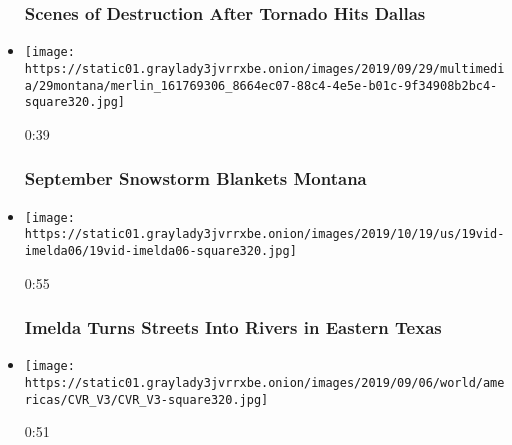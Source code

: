 \begin{itemize}
  \hypertarget{scenes-of-destruction-after-tornado-hits-dallas}{%
  \subsubsection{Scenes of Destruction After Tornado Hits
  Dallas}\label{scenes-of-destruction-after-tornado-hits-dallas}}
\item
  \href{https://www.nytimes3xbfgragh.onion/video/climate/100000006743923/montana-snow-storm.html?action=click\&module=video-series-bar\&region=header\&pgtype=Article\&playlistId=video/extreme-weather}{}

  \texttt{[image: https://static01.graylady3jvrrxbe.onion/images/2019/09/29/multimedia/29montana/merlin\_161769306\_8664ec07-88c4-4e5e-b01c-9f34908b2bc4-square320.jpg]}

  0:39

  \hypertarget{september-snowstorm-blankets-montana}{%
  \subsubsection{September Snowstorm Blankets
  Montana}\label{september-snowstorm-blankets-montana}}
\item
  \href{https://www.nytimes3xbfgragh.onion/video/us/100000006726109/imelda-texas-floods.html?action=click\&module=video-series-bar\&region=header\&pgtype=Article\&playlistId=video/extreme-weather}{}

  \texttt{[image: https://static01.graylady3jvrrxbe.onion/images/2019/10/19/us/19vid-imelda06/19vid-imelda06-square320.jpg]}

  0:55

  \hypertarget{imelda-turns-streets-into-rivers-in-eastern-texas}{%
  \subsubsection{Imelda Turns Streets Into Rivers in Eastern
  Texas}\label{imelda-turns-streets-into-rivers-in-eastern-texas}}
\item
  \href{https://www.nytimes3xbfgragh.onion/video/world/americas/100000006701860/hurricane-dorian-destruction.html?action=click\&module=video-series-bar\&region=header\&pgtype=Article\&playlistId=video/extreme-weather}{}

  \texttt{[image: https://static01.graylady3jvrrxbe.onion/images/2019/09/06/world/americas/CVR\_V3/CVR\_V3-square320.jpg]}

  0:51

  \hypertarget{what-hurricane-dorian-destroyed-satellite-images-of-great-abaco-island}{%
}
\end{itemize}

